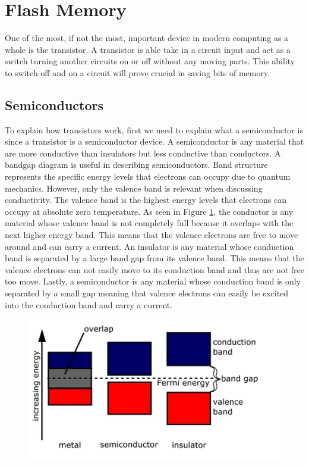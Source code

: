 \documentclass[ aip, 12pt]{revtex4-1} %
\begin{document}
\section{Flash Memory}

One of the most, if not the most, important device in modern computing as a whole is the transistor. A transistor is able take in a circuit input and act as a switch turning another circuits on or off without any moving parts. This ability to switch off and on a circuit will prove crucial in saving bits of memory.

\subsection{Semiconductors}
To explain how transistors work, first we need to explain what a semiconductor is since a transistor is a semiconductor device. A semiconductor is any material that are more conductive than insulators but less conductive than conductors.  A bandgap diagram is useful in describing semiconductors. Band structure represents the specific energy levels that electrons can occupy due to quantum mechanics. However, only the valence band is relevant when discussing conductivity. The valence band is the highest energy levels that electrons can occupy at absolute zero temperature. As seen in Figure \ref{bandGap}, the conductor is any material whose valence band is not completely full because it overlaps with the next higher energy band. This means that the valence electrons are free to move around and can carry a current. An insulator is any material whose conduction band is separated by a large band gap from its valence band. This means that the valence electrons can not easily move to its conduction band and thus are not free too move. Lastly, a semiconductor is any material whose conduction band is only separated by a small gap meaning that valence electrons can easily be excited into the conduction band and carry a current.


\begin{figure}[H]
\centerline{\includegraphics[scale=.45]{bandGap.png}}
\caption{ }
\label{bandGap}
\end{figure}
\end{document}
